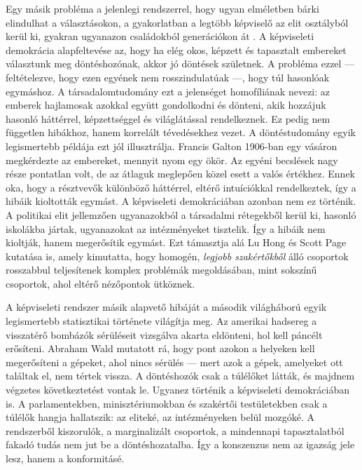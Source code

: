 Egy másik probléma a jelenlegi rendszerrel, hogy ugyan elméletben bárki elindulhat
a választásokon, a gyakorlatban a legtöbb képviselő az elit osztályból kerül ki,
gyakran ugyanazon családokból generációkon át \cite{reps_are_homogen_1, reps_are_homogen_2,
reps_are_homogen_3}.  A képviseleti demokrácia alapfeltevése az, hogy ha elég okos, képzett
és tapasztalt embereket választunk meg döntéshozónak, akkor jó döntések születnek. A
probléma ezzel --- feltételezve, hogy ezen egyének nem  rosszindulatúak ---, hogy túl
hasonlóak egymáshoz. A társadalomtudomány ezt a jelenséget homofíliának nevezi: az
emberek hajlamosak azokkal együtt gondolkodni és dönteni, akik hozzájuk hasonló háttérrel,
képzettséggel és világlátással rendelkeznek. Ez pedig nem független hibákhoz, hanem
korrelált tévedésekhez vezet. A döntéstudomány egyik legismertebb példája ezt jól
illusztrálja. Francis Galton 1906-ban \cite{wisdom_of_crowds, wisdom_of_crowds_wiki} egy
vásáron megkérdezte az embereket, mennyit nyom egy ökör. Az egyéni becslések nagy része
pontatlan volt, de az átlaguk meglepően közel esett a valós értékhez. Ennek oka, hogy a
résztvevők különböző háttérrel, eltérő intuíciókkal rendelkeztek, így a hibáik
kioltották egymást. A képviseleti demokráciában azonban nem ez történik. A politikai elit
jellemzően ugyanazokból a társadalmi rétegekből kerül ki, hasonló iskolákba jártak,
ugyanazokat az intézményeket tisztelik. Így a hibáik nem kioltják, hanem megerősítik
egymást. Ezt támasztja alá Lu Hong és Scott Page \cite{diverse_groups_are_better} kutatása
is, amely kimutatta, hogy homogén, \textit{legjobb szakértőkből} álló csoportok rosszabbul
teljesítenek komplex problémák megoldásában, mint sokszínű csoportok, ahol eltérő
nézőpontok ütköznek.

A képviseleti rendszer másik alapvető hibáját a második világháború egyik legismertebb
statisztikai története világítja meg. Az amerikai hadsereg a visszatérő bombázók
sérüléseit vizsgálva akarta eldönteni, hol kell páncélt erősíteni. Abraham Wald
\cite{aircraft} mutatott rá, hogy pont azokon a helyeken kell megerősíteni a gépeket, ahol
nincs sérülés --- mert azok a gépek, amelyeket ott találtak el, nem tértek vissza. A
döntéshozók csak a túlélőket látták, és majdnem végzetes következtetést vontak
le. Ugyanez történik a képviseleti demokráciában is. A parlamentekben, minisztériumokban és
szakértői testületekben csak a túlélők hangja hallatszik: az eliteké, az intézményeken
belül mozgóké. A rendszerből kiszorulók, a marginalizált csoportok, a mindennapi
tapasztalatból fakadó tudás nem jut be a döntéshozatalba. Így a konszenzus nem az igazság
jele lesz, hanem a konformitásé.

